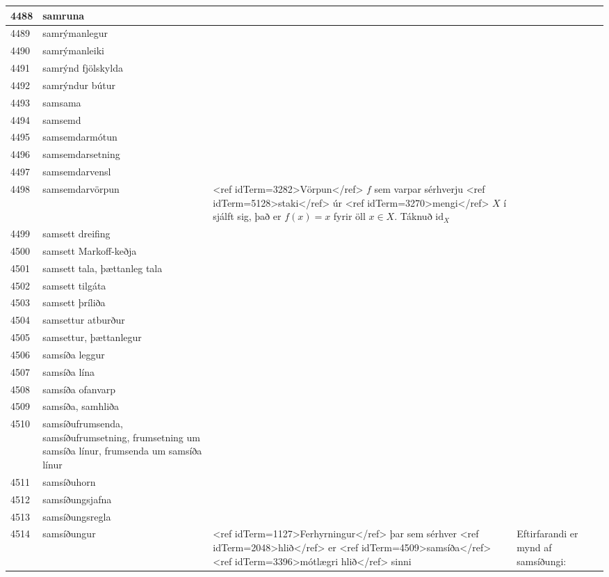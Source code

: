 \begin{longtable}{p{}|p{}|p{}|p{}|p{}}
\hline
4488 & samruna &  &  &  \\
\hline
4489 & samrýmanlegur &  &  &  \\
\hline
4490 & samrýmanleiki &  &  &  \\
\hline
4491 & samrýnd fjölskylda &  &  &  \\
\hline
4492 & samrýndur bútur &  &  &  \\
\hline
4493 & samsama &  &  &  \\
\hline
4494 & samsemd &  &  &  \\
\hline
4495 & samsemdarmótun &  &  &  \\
\hline
4496 & samsemdarsetning &  &  &  \\
\hline
4497 & samsemdarvensl &  &  &  \\
\hline
4498 & samsemdarvörpun & <ref idTerm=3282>Vörpun</ref> $f$ sem varpar sérhverju <ref idTerm=5128>staki</ref> úr <ref idTerm=3270>mengi</ref> $X$ í sjálft sig, það er $f(x)=x$ fyrir öll $x \in X$. Táknuð $\mathrm{id}_X$ &  & \\
\hline
4499 & samsett dreifing &  &  &  \\
\hline
4500 & samsett Markoff-keðja &  &  &  \\
\hline
4501 & samsett tala, þættanleg tala &  &  &  \\
\hline
4502 & samsett tilgáta &  &  &  \\
\hline
4503 & samsett þríliða &  &  &  \\
\hline
4504 & samsettur atburður &  &  &  \\
\hline
4505 & samsettur, þættanlegur &  &  &  \\
\hline
4506 & samsíða leggur &  &  &  \\
\hline
4507 & samsíða lína &  &  &  \\
\hline
4508 & samsíða ofanvarp &  &  &  \\
\hline
4509 & samsíða, samhliða &  &  &  \\
\hline
4510 & samsíðufrumsenda, samsíðufrumsetning, frumsetning um samsíða línur, frumsenda um samsíða línur &  &  &  \\
\hline
4511 & samsíðuhorn &  &  &  \\
\hline
4512 & samsíðungsjafna &  &  &  \\
\hline
4513 & samsíðungsregla &  &  &  \\
\hline
4514 & samsíðungur & <ref idTerm=1127>Ferhyrningur</ref> þar sem sérhver <ref idTerm=2048>hlið</ref> er <ref idTerm=4509>samsíða</ref> <ref idTerm=3396>mótlægri hlið</ref> sinni & Eftirfarandi er mynd af samsíðungi:


\end{longtable}
